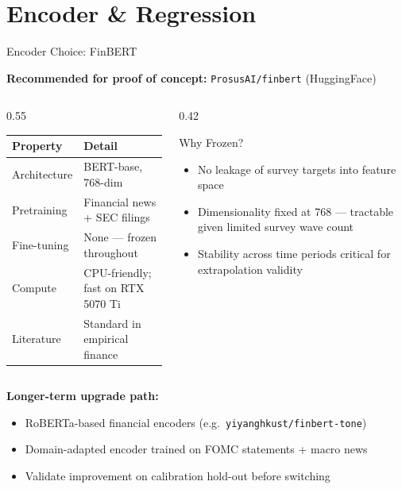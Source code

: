 \documentclass[aspectratio=169, 11pt]{beamer}
\begin{document}
\section{Encoder \& Regression}

\begin{frame}{Encoder Choice: FinBERT}

\textbf{Recommended for proof of concept:} \texttt{ProsusAI/finbert} (HuggingFace)

\vspace{0.3cm}
\begin{columns}
\begin{column}{0.55\textwidth}
  \begin{tabular}{ll}
    \toprule
    Property & Detail \\
    \midrule
    Architecture & BERT-base, 768-dim \\
    Pretraining & Financial news + SEC filings \\
    Fine-tuning & None --- frozen throughout \\
    Compute & CPU-friendly; fast on RTX 5070 Ti \\
    Literature & Standard in empirical finance \\
    \bottomrule
  \end{tabular}
\end{column}
\begin{column}{0.42\textwidth}
  \begin{block}{Why Frozen?}
    \begin{itemize}
      \item No leakage of survey targets into feature space
      \item Dimensionality fixed at 768 --- tractable given limited survey wave count
      \item Stability across time periods critical for extrapolation validity
    \end{itemize}
  \end{block}
\end{column}
\end{columns}

\vspace{0.4cm}
\textbf{Longer-term upgrade path:}
\begin{itemize}
  \item RoBERTa-based financial encoders (e.g.\ \texttt{yiyanghkust/finbert-tone})
  \item Domain-adapted encoder trained on FOMC statements + macro news
  \item Validate improvement on calibration hold-out before switching
\end{itemize}

\end{frame}
\end{document}
